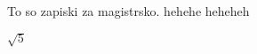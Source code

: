 \documentclass[a4paper]{article}
\begin{document}
To so zapiski za magistrsko. hehehe
heheheh

$\sqrt{5}$

            
\end{document}
